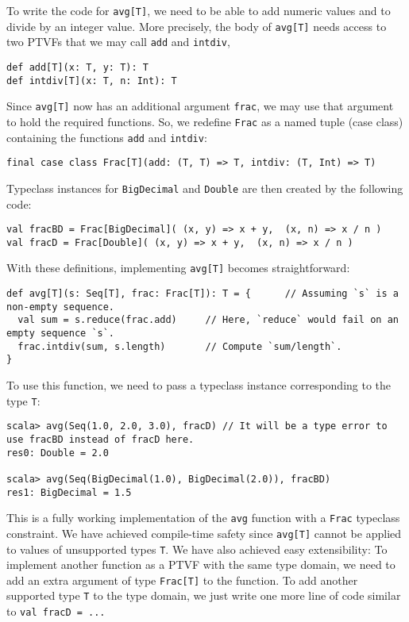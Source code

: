 To write the code for \lstinline!avg[T]!, we need to be able to add
numeric values and to divide by an integer value. More precisely,
the body of \lstinline!avg[T]! needs access to two PTVFs that we
may call \lstinline!add! and \lstinline!intdiv!,
\begin{lstlisting}
def add[T](x: T, y: T): T
def intdiv[T](x: T, n: Int): T
\end{lstlisting}
Since \lstinline!avg[T]! now has an additional argument \lstinline!frac!,
we may use that argument to hold the required functions. So, we redefine
\lstinline!Frac! as a named tuple (case class) containing the functions
\lstinline!add! and \lstinline!intdiv!:
\begin{lstlisting}
final case class Frac[T](add: (T, T) => T, intdiv: (T, Int) => T)
\end{lstlisting}
Typeclass instances for \lstinline!BigDecimal! and \lstinline!Double!
are then created by the following code:
\begin{lstlisting}
val fracBD = Frac[BigDecimal]( (x, y) => x + y,  (x, n) => x / n )
val fracD = Frac[Double]( (x, y) => x + y,  (x, n) => x / n )
\end{lstlisting}
With these definitions, implementing \lstinline!avg[T]! becomes straightforward:
\begin{lstlisting}
def avg[T](s: Seq[T], frac: Frac[T]): T = {      // Assuming `s` is a non-empty sequence.
  val sum = s.reduce(frac.add)     // Here, `reduce` would fail on an empty sequence `s`.
  frac.intdiv(sum, s.length)       // Compute `sum/length`.
}
\end{lstlisting}
To use this function, we need to pass a typeclass instance corresponding
to the type \lstinline!T!:
\begin{lstlisting}
scala> avg(Seq(1.0, 2.0, 3.0), fracD) // It will be a type error to use fracBD instead of fracD here.
res0: Double = 2.0

scala> avg(Seq(BigDecimal(1.0), BigDecimal(2.0)), fracBD)
res1: BigDecimal = 1.5
\end{lstlisting}

This is a fully working implementation of the \lstinline!avg! function
with a \lstinline!Frac! typeclass constraint. We have achieved compile-time
safety since \lstinline!avg[T]! cannot be applied to values of unsupported
types \lstinline!T!. We have also achieved easy extensibility: To
implement another function as a PTVF with the same type domain, we
need to add an extra argument of type \lstinline!Frac[T]! to the
function. To add another supported type \lstinline!T! to the type
domain, we just write one more line of code similar to \lstinline!val fracD = ...!


